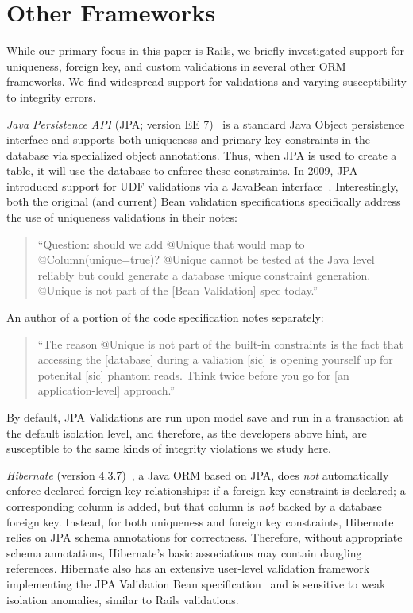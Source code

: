 
\section{Other Frameworks}
\label{sec:other-orms}

While our primary focus in this paper is Rails, we briefly investigated
support for uniqueness, foreign key, and custom validations in several
other ORM frameworks. We find widespread support for validations and
varying susceptibility to integrity errors.

\newcommand{\orm}[1]{{\vspace{.45em}\noindent\textit{#1}}}

\orm{Java Persistence API} (JPA; version EE 7)~\cite{code-jpa} is a
standard Java Object persistence interface and supports both
uniqueness and primary key constraints in the database via specialized
object annotations. Thus, when JPA is used to create a table, it will
use the database to enforce these constraints. In 2009, JPA introduced
support for UDF validations via a JavaBean
interface~\cite{code-bean-validation}. Interestingly, both the
original (and current) Bean validation specifications specifically
address the use of uniqueness validations in their notes:
\begin{quote}
``Question: should we add @Unique that would map to @Column(unique=true)?
@Unique cannot be tested at the Java level reliably but could generate
a database unique constraint generation. @Unique is not part
of the [Bean Validation] spec today.''~\cite{jsr-bean}
\end{quote}
An author of a portion of the code specification notes separately:
\begin{quote}
  ``The reason @Unique is not part of the built-in constraints is the
  fact that accessing the [database] during a valiation [sic] is
  opening yourself up for potenital [sic] phantom reads. Think twice
  before you go for [an application-level] approach.''~\cite{unique-bean}
\end{quote}
By default, JPA Validations are run upon model save and run in a
transaction at the default isolation level, and therefore, as the
developers above hint, are susceptible to the same kinds of integrity
violations we study here.

\orm{Hibernate} (version 4.3.7)~\cite{code-hibernate}, a Java ORM
based on JPA, does \textit{not} automatically enforce declared foreign
key relationships: if a foreign key constraint is declared; a
corresponding column is added, but that column is \textit{not} backed by a
database foreign key. Instead, for both uniqueness and foreign key
constraints, Hibernate relies on JPA schema annotations for
correctness. Therefore, without appropriate schema annotations,
Hibernate's basic associations may contain dangling references. Hibernate also has an extensive user-level validation
framework implementing the JPA Validation Bean
specification~\cite{code-hibernate-validator} and is sensitive to weak
isolation anomalies, similar to Rails validations.

